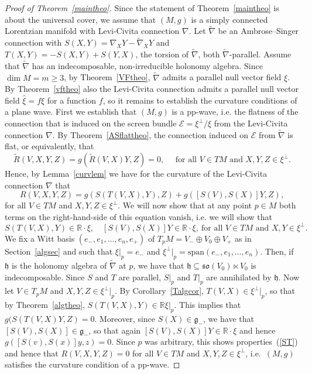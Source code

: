 \documentclass[11pt,a4paper]{amsart}
\newcommand{\tnab}{\widetilde{\nabla}}
\newcommand{\tR}{\widetilde{R}}
\newcommand{\g}{\mathfrak{g}}
\newcommand{\h}{\mathfrak{h}}
\newcommand{\+}{\oplus}
\newcommand{\so}{\mathfrak{so}}
\newcommand{\1}{\mathbf{1}}
\newcommand{\R}{\mathbb{R}} %
\newcommand{\<}{\langle}
\renewcommand{\>}{\rangle}
\theoremstyle{definition}
\theoremstyle{plain}
\numberwithin{equation}{section}
\begin{document}
\begin{proof}[Proof of Theorem~\ref{maintheo}]
Since the statement of Theorem~\ref{maintheo} is about the universal cover, we assume that
 $(M,g)$ is a simply connected Lorentzian manifold with Levi-Civita connection $\nabla$. Let $\tnab$ be an  Ambrose--Singer connection 
with  $S(X,Y)=\nabla_XY-\tnab_XY$ and $T(X,Y)=-S(X,Y)+S(Y,X)$, the torsion of $\tnab$,  both  $\tnab$-parallel. 
Assume that $\tnab$ 
 has an indecomposable, non-irreducible holonomy algebra. Since $\dim M=m\ge 3$,  by Theorem~\ref{VFtheo}, $\tnab$ admits a parallel null vector field $\xi$.  By Theorem~\ref{vftheo}  also the Levi-Civita connection admits a parallel null vector field $\hat\xi =f\xi$ for a function $f$, so it remains to establish the curvature conditions of a plane wave. First we establish that $(M,g)$ is a pp-wave, i.e.
   the flatness of the connection that is induced on  the screen bundle $\mathcal E=\xi^\perp/\xi$  from the Levi-Civita connection $\nabla$. By Theorem~\ref{ASflattheo}, the connection induced on $\mathcal E$ from $\tnab$ is flat, or equivalently, that 
 \[\tR(V,X,Y,Z)=g(\tR(V,X)Y,Z)=0,\quad\text{ for all $V\in TM$ and $X,Y,Z\in \xi^\perp$.}\] 
 Hence, by Lemma~\ref{curvlem} we have for the curvature of the Levi-Civita connection $\nabla$ that
 \[ R(V,X,Y,Z)=g(S(T(V,X),Y),Z)+g([ S(V),S(X)]Y,Z),\]
 for all $V\in TM$ and $X,Y,Z\in \xi^\perp$. We will now show that at any point $p\in M$ both terms on the right-hand-side of this equation vanish, i.e. we will show that
 \begin{equation}\label{ST}
 S(T(V,X),Y)\in \R\cdot\xi,\quad [ S(V),S(X)]Y\in \R\cdot\xi,\ \text{
 for all $V\in TM$ and $X,Y\in \xi^\perp$.}\end{equation}
  We fix a Witt basis $(e_-,e_1,\ldots, e_n, e_+)$ of $T_pM=V_-\+V_0\+V_+$ as in Section~\ref{algsec} and  such that $\xi|_p=e_-$ and $\xi^\perp|_p=\mathrm{span}(e_-,e_1, \ldots, e_n)$. Then, if $\h$ is the holonomy algebra of $\tnab$ at $p$, we have that $\h\subseteq\so(V_0)\ltimes V_0$ is indecomposable. Since $S$ and $T$ are parallel, $S|_p$ and $T|_p$  are annihilated by $\h$. Now let $V\in T_pM$ and $X,Y,Z\in \xi^\perp|_p$. By Corollary~\ref{Talgcor}, $T(V,X)\in \xi^\perp|_p$, so that by Theorem~\ref{algtheo}, $S(T(V,X),Y)\in \R\xi|_p$. This implies that  $g(S(T(V,X)Y,Z)=0$. Moreover, since $S(X)\in \g_-$, we have that $[S(V),S(X)]\in \g_-$, so that again $[S(V),S(X)]Y\in \R\cdot \xi$ and hence $g([S(v),S(x)]y,z)=0$. Since $p$ was arbitrary, this shows properties~(\ref{ST}) and hence that $R(V,X,Y,Z)=0$
 for all $V\in TM$ and $X,Y,Z\in \xi^\perp$, i.e.~$(M,g)$ satisfies the curvature condition of a pp-wave. 
 

\end{proof}
\end{document}
